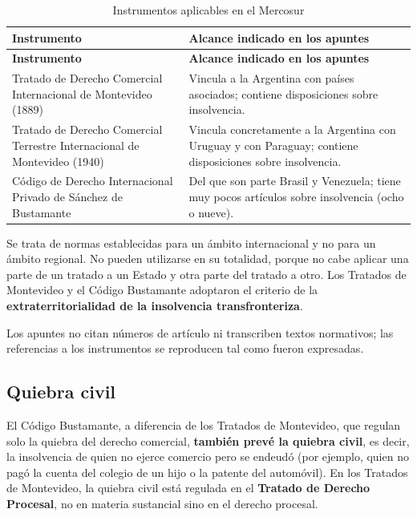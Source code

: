 \documentclass[12pt,oneside]{book}
\begin{document}
\begin{longtable}{>{\raggedright\arraybackslash}p{} >{\raggedright\arraybackslash}p{}}
\caption{Instrumentos aplicables en el Mercosur}\\
\toprule
\textbf{Instrumento} & \textbf{Alcance indicado en los apuntes} \\
\midrule
\endfirsthead
\toprule
\textbf{Instrumento} & \textbf{Alcance indicado en los apuntes} \\
\midrule
\endhead
\bottomrule
\endlastfoot
Tratado de Derecho Comercial Internacional de Montevideo (1889) & Vincula a la Argentina con países asociados; contiene disposiciones sobre insolvencia. \\
Tratado de Derecho Comercial Terrestre Internacional de Montevideo (1940) & Vincula concretamente a la Argentina con Uruguay y con Paraguay; contiene disposiciones sobre insolvencia. \\
Código de Derecho Internacional Privado de Sánchez de Bustamante & Del que son parte Brasil y Venezuela; tiene muy pocos artículos sobre insolvencia (ocho o nueve). \\
\end{longtable}

Se trata de normas establecidas para un ámbito internacional y no para un ámbito regional. No pueden utilizarse en su totalidad, porque no cabe aplicar una parte de un tratado a un Estado y otra parte del tratado a otro. Los Tratados de Montevideo y el Código Bustamante adoptaron el criterio de la \textbf{extraterritorialidad de la insolvencia transfronteriza}.

\begin{note}
Los apuntes no citan números de artículo ni transcriben textos normativos; las referencias a los instrumentos se reproducen tal como fueron expresadas.
\end{note}

\subsection{Quiebra civil}

El Código Bustamante, a diferencia de los Tratados de Montevideo, que regulan solo la quiebra del derecho comercial, \textbf{también prevé la quiebra civil}, es decir, la insolvencia de quien no ejerce comercio pero se endeudó (por ejemplo, quien no pagó la cuenta del colegio de un hijo o la patente del automóvil). En los Tratados de Montevideo, la quiebra civil está regulada en el \textbf{Tratado de Derecho Procesal}, no en materia sustancial sino en el derecho procesal.
\end{document}
